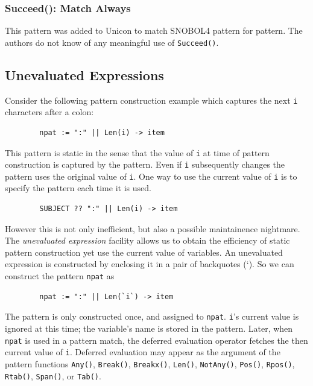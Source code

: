 \documentclass[letterpaper,12pt]{article}
\begin{document}
\subsubsection{Succeed(): Match Always}

This pattern was added to Unicon to match SNOBOL4 pattern for
pattern. The authors do not know of any meaningful use of {\tt Succeed()}.


\subsection{Unevaluated Expressions}

Consider the following pattern construction example which captures the
next {\tt i} characters after a colon:

\begin{verbatim}
        npat := ":" || Len(i) -> item
\end{verbatim}

This pattern is static in the sense that the value of {\tt i} at
time of pattern construction is captured by the pattern. Even if
\texttt{i} subsequently changes the pattern uses the original value of
\texttt{i}. One way to use the current value of \texttt{i} is to
specify the pattern each time it is used.

\begin{verbatim}
        SUBJECT ?? ":" || Len(i) -> item
\end{verbatim}

However this is not only inefficient, but also a possible maintainence
nightmare. The {\em unevaluated expression\/} facility allows us to obtain
the efficiency of static pattern construction yet use the current
value of variables. An unevaluated expression is constructed by
enclosing it in a pair of backquotes (`). So we can construct the pattern
\texttt{npat} as

\begin{verbatim}
        npat := ":" || Len(`i`) -> item
\end{verbatim}

The pattern is only constructed once, and assigned to
\texttt{npat}. \texttt{i}'s current value is ignored at this
time; the variable's name is stored in the pattern.
Later, when \texttt{npat} is used in a pattern match, the
deferred evaluation operator fetches the then current value of
\texttt{i}. Deferred evaluation may appear as the argument of the
pattern functions {\tt Any()}, {\tt Break()}, {\tt Breakx()}, {\tt Len()},
{\tt NotAny()}, {\tt Pos()}, {\tt Rpos()}, {\tt Rtab()}, {\tt Span()},
or {\tt Tab()}.
\end{document}
